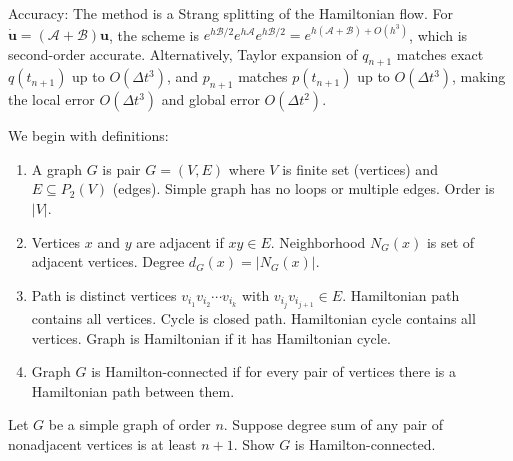 \begin{solution}
Accuracy: The method is a Strang splitting of the Hamiltonian flow. For $\dot{\mathbf{u}} = (\mathcal{A}+\mathcal{B})\mathbf{u}$, the scheme is $e^{h\mathcal{B}/2} e^{h\mathcal{A}} e^{h\mathcal{B}/2} = e^{h(\mathcal{A}+\mathcal{B}) + O(h^3)}$, which is second-order accurate. Alternatively, Taylor expansion of $q_{n+1}$ matches exact $q(t_{n+1})$ up to $O(\Delta t^3)$, and $p_{n+1}$ matches $p(t_{n+1})$ up to $O(\Delta t^3)$, making the local error $O(\Delta t^3)$ and global error $O(\Delta t^2)$.
\end{solution}

\begin{exercise}
\label{applied:2018:3}
We begin with definitions:
\begin{enumerate}
\item[(1)] A graph $G$ is pair $G=(V,E)$ where $V$ is finite set (vertices) and $E\subseteq P_{2}(V)$ (edges). Simple graph has no loops or multiple edges. Order is $|V|$.
\item[(2)] Vertices $x$ and $y$ are adjacent if $xy\in E$. Neighborhood $N_{G}(x)$ is set of adjacent vertices. Degree $d_{G}(x)=|N_{G}(x)|$.
\item[(3)] Path is distinct vertices $v_{i_{1}}v_{i_{2}}\cdots v_{i_{k}}$ with $v_{i_{j}}v_{i_{j+1}}\in E$. Hamiltonian path contains all vertices. Cycle is closed path. Hamiltonian cycle contains all vertices. Graph is Hamiltonian if it has Hamiltonian cycle.
\item[(4)] Graph $G$ is Hamilton-connected if for every pair of vertices there is a Hamiltonian path between them.
\end{enumerate}

Let $G$ be a simple graph of order $n$. Suppose degree sum of any pair of nonadjacent vertices is at least $n+1$. Show $G$ is Hamilton-connected.
\end{exercise}

